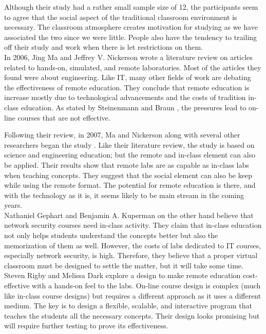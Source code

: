 \documentclass[titlepage]{article}
\begin{document}
\noindent Although their study had a rather small sample size of 12, the participants seem to agree that
the social aspect of the traditional classroom environment is necessary.  The classroom
atmosphere creates motivation for studying as we have associated the two since we were
little.  People also have the tendency to trailing off their study and work when there is
let restrictions on them.\\

\noindent In 2006, Jing Ma and Jeffrey V. Nickerson \cite{2} wrote a literature review on articles
related to hands-on, simulated, and remote laboratories.  Most of the articles they found were about
engineering.  Like IT, many other fields of work are debating the effectiveness of remote education.
They conclude that remote education is increase mostly due to technological advancements and the
costs of tradition in-class education.  As stated by Steinenmann and Braun \cite{1}, the pressures
lead to on-line courses that are not effective.\\

\clearpage

\noindent Following their review, in 2007, Ma and Nickerson along with several other
researchers began the study \cite{3}.  Like their literature review, the study is based on science and
engineering education; but the remote and in-class element can also be applied.  Their results show that
remote labs are as capable as in-class labs when teaching concepts.  They suggest that the social
element can also be keep while using the remote format.  The potential for remote education is there,
and with the technology as it is, it seems likely to be main stream in the coming years.\\

\noindent Nathaniel Gephart and Benjamin A. Kuperman \cite{4} on the other hand believe that
network security courses need in-class activity.  They claim that in-class education not only helps
students understand the concepts better but also the memorization of them as well.  However, the
costs of labs dedicated to IT courses, especially network security, is high.  Therefore, they believe
that a proper virtual classroom must be designed to settle the matter, but it will take some time.\\

\noindent Steven Rigby and Melissa Dark \cite{5} explore a design to make remote education
cost-effective with a hands-on feel to the labs.  On-line course design is complex (much like
in-class course designs) but requires a different approach as it uses a different medium.  The
key is to design a flexible, scalable, and interactive program that teaches the students all the
necessary concepts.  Their design looks promising but will require further testing to prove
its effectiveness.\\
\end{document}

